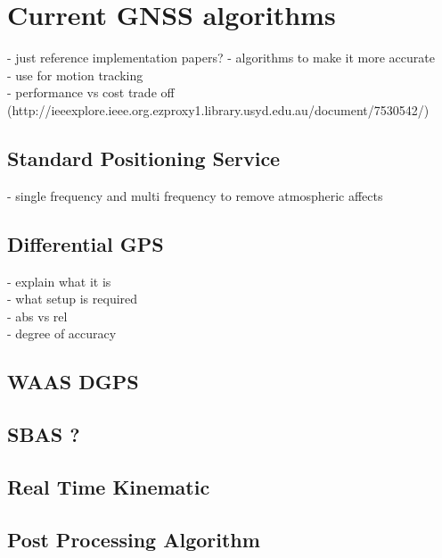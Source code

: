 
\section{Current GNSS algorithms}
- just reference implementation papers?
- algorithms to make it more accurate\\
- use for motion tracking\\
- performance vs cost trade off\\
(http://ieeexplore.ieee.org.ezproxy1.library.usyd.edu.au/document/7530542/)
\subsection{Standard Positioning Service}
- single frequency and multi frequency to remove atmospheric affects
\subsection{Differential GPS}


- explain what it is\\
- what setup is required \\
- abs vs rel \\
- degree of accuracy
\subsection{WAAS DGPS}

\subsection{SBAS  ?}

\subsection{Real Time Kinematic}

\subsection{Post Processing Algorithm}

